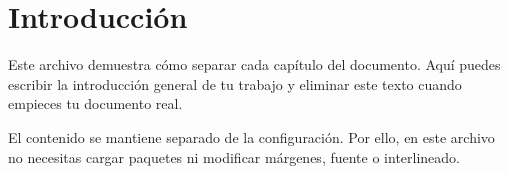 \chapter{Introducción}

Este archivo demuestra cómo separar cada capítulo del documento. Aquí puedes escribir la introducción general de tu trabajo y eliminar este texto cuando empieces tu documento real.

El contenido se mantiene separado de la configuración. Por ello, en este archivo no necesitas cargar paquetes ni modificar márgenes, fuente o interlineado.
